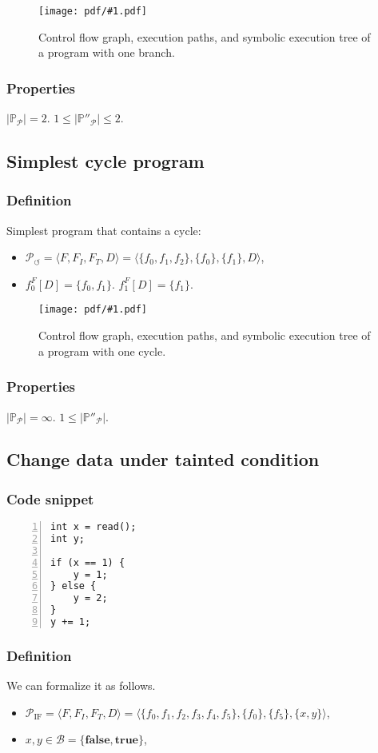 \documentclass[oneside,a4]{article}  %
\newcommand{\sublevel}{\subsection}
\newcommand{\subsublevel}{\subsubsection}
\newcommand{\true}{\textbf{true}}
\newcommand{\false}{\textbf{false}}
\newcommand{\centerimage}[2]{
\begin{figure}[h!]
    \begin{center}
        \texttt{[image: pdf/\#1.pdf]}
        \caption{#2}
    \end{center}
    \label{img:#1}
\end{figure}
}
\begin{document}
\centerimage{execution_branch}
    {Control flow graph, execution paths,
        and symbolic execution tree of a program with one branch.}

\subsublevel*{Properties}

$|\mathds{P}_\mathcal{P}| = 2$.
$1 \le |\mathds{P}''_\mathcal{P}| \le 2$.

\sublevel{Simplest cycle program}

\subsublevel*{Definition}

Simplest program that contains a cycle:
\begin{itemize}
    \item $\mathcal{P}_{\circlearrowleft} = \langle F, F_I, F_T, D \rangle =
        \langle \{f_0, f_1, f_2\}, \{f_0\}, \{f_1\}, D \rangle$,
    \item $f_0^F[D] = \{f_0, f_1\}$. $f_1^F[D] = \{f_1\}$.
\end{itemize}

\centerimage{execution_cycle}
    {Control flow graph, execution paths,
        and symbolic execution tree of a program with one cycle.}

\subsublevel*{Properties}

$|\mathds{P}_\mathcal{P}| = \infty$.
$1 \le |\mathds{P}''_\mathcal{P}|$.

\sublevel{Change data under tainted condition}

\subsublevel*{Code snippet}

\begin{lstlisting}[numbers=left,numberstyle=\scriptsize]
int x = read();
int y;

if (x == 1) {
    y = 1;
} else {
    y = 2;
}
y += 1;
\end{lstlisting}

\subsublevel*{Definition}

We can formalize it as follows.
\begin{itemize}
    \item $\mathcal{P}_\text{IF} = \langle F, F_I, F_T, D \rangle =
    \langle \{f_0, f_1, f_2, f_3, f_4, f_5\},
        \{f_0\}, \{f_5\}, \{x, y\} \rangle$,
    \item $x, y \in \mathcal{B} = \{\false, \true\}$,
\end{itemize}
\end{document}
